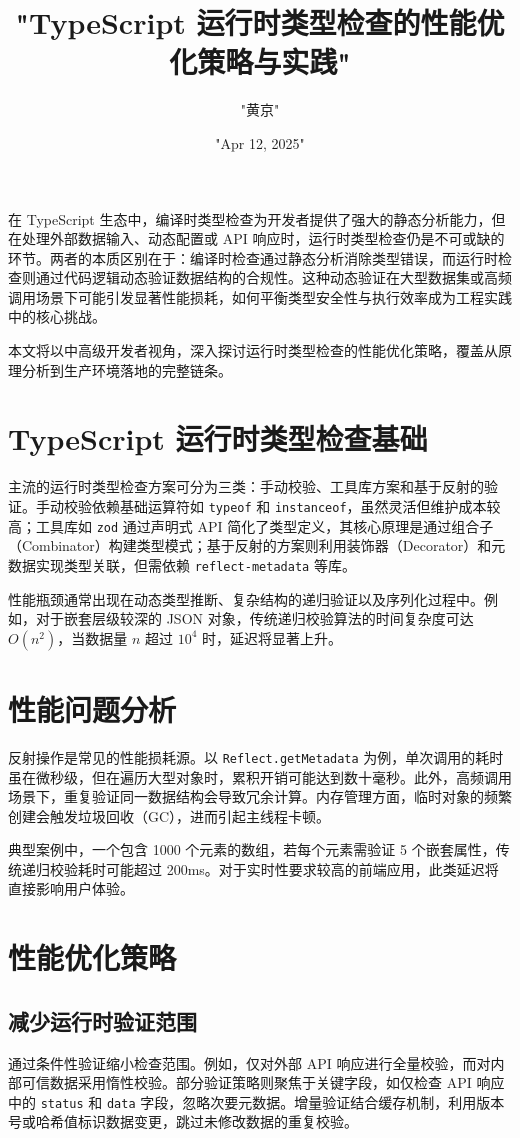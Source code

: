 \title{"TypeScript 运行时类型检查的性能优化策略与实践"}
\author{"黄京"}
\date{"Apr 12, 2025"}
\maketitle
在 TypeScript 生态中，编译时类型检查为开发者提供了强大的静态分析能力，但在处理外部数据输入、动态配置或 API 响应时，运行时类型检查仍是不可或缺的环节。两者的本质区别在于：编译时检查通过静态分析消除类型错误，而运行时检查则通过代码逻辑动态验证数据结构的合规性。这种动态验证在大型数据集或高频调用场景下可能引发显著性能损耗，如何平衡类型安全性与执行效率成为工程实践中的核心挑战。\par
本文将以中高级开发者视角，深入探讨运行时类型检查的性能优化策略，覆盖从原理分析到生产环境落地的完整链条。\par
\chapter{TypeScript 运行时类型检查基础}
主流的运行时类型检查方案可分为三类：手动校验、工具库方案和基于反射的验证。手动校验依赖基础运算符如 \verb!typeof! 和 \verb!instanceof!，虽然灵活但维护成本较高；工具库如 \verb!zod! 通过声明式 API 简化了类型定义，其核心原理是通过组合子（Combinator）构建类型模式；基于反射的方案则利用装饰器（Decorator）和元数据实现类型关联，但需依赖 \verb!reflect-metadata! 等库。\par
性能瓶颈通常出现在动态类型推断、复杂结构的递归验证以及序列化过程中。例如，对于嵌套层级较深的 JSON 对象，传统递归校验算法的时间复杂度可达 $O(n^2)$，当数据量 $n$ 超过 $10^4$ 时，延迟将显著上升。\par
\chapter{性能问题分析}
反射操作是常见的性能损耗源。以 \verb!Reflect.getMetadata! 为例，单次调用的耗时虽在微秒级，但在遍历大型对象时，累积开销可能达到数十毫秒。此外，高频调用场景下，重复验证同一数据结构会导致冗余计算。内存管理方面，临时对象的频繁创建会触发垃圾回收（GC），进而引起主线程卡顿。\par
典型案例中，一个包含 1000 个元素的数组，若每个元素需验证 5 个嵌套属性，传统递归校验耗时可能超过 200ms。对于实时性要求较高的前端应用，此类延迟将直接影响用户体验。\par
\chapter{性能优化策略}
\section{减少运行时验证范围}
通过条件性验证缩小检查范围。例如，仅对外部 API 响应进行全量校验，而对内部可信数据采用惰性校验。部分验证策略则聚焦于关键字段，如仅检查 API 响应中的 \verb!status! 和 \verb!data! 字段，忽略次要元数据。增量验证结合缓存机制，利用版本号或哈希值标识数据变更，跳过未修改数据的重复校验。\par
